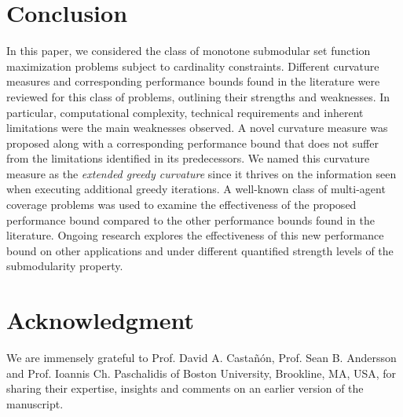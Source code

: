 \documentclass[conference]{IEEEtran}
\begin{document}






\section{Conclusion}
\label{Sec:Conclusion}

In this paper, we considered the class of monotone submodular set function maximization problems subject to cardinality constraints. Different curvature measures and corresponding performance bounds found in the literature were reviewed for this class of problems, outlining their strengths and weaknesses. In particular, computational complexity, technical requirements and inherent limitations were the main weaknesses observed. A novel curvature measure was proposed along with a corresponding performance bound that does not suffer from the limitations identified in its predecessors. We named this curvature measure as the \emph{extended greedy curvature} since it thrives on the information seen when executing additional greedy iterations. A well-known class of multi-agent coverage problems was used to examine the effectiveness of the proposed performance bound compared to the other performance bounds found in the literature. Ongoing research explores the effectiveness of this new performance bound on other applications and under different quantified strength levels of the submodularity property.

\section*{Acknowledgment}
We are immensely grateful to Prof. David A. Casta\~n\'on, Prof. Sean B. Andersson and Prof. Ioannis Ch. Paschalidis of Boston University, Brookline, MA, USA, for sharing their expertise, insights and comments on an earlier version of the manuscript.  






\end{document}
